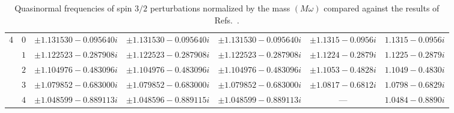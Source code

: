\begin{table}[ht]
{\begin{tabular}{l |c|c|c|c|c|c}
      4   & $0$ & $\pm 1.131530 -0.095640 i$                & $\pm 1.131530 -0.095640 i$                 & $\pm 1.131530 -0.095640 i$ & $\pm 1.1315 -0.0956 i$ & $1.1315 -0.0956 i$       \\
          & $1$ & $\pm 1.122523 -0.287908 i$                & $\pm 1.122523 -0.287908 i$                 & $\pm 1.122523 -0.287908 i$ & $\pm 1.1224 -0.2879 i$ & $1.1225 -0.2879 i$       \\
          & $2$ & $\pm 1.104976 -0.483096 i$                & $\pm 1.104976 -0.483096 i$                 & $\pm 1.104976 -0.483096 i$ & $\pm 1.1053 -0.4828 i$ & $1.1049 -0.4830 i$       \\
          & $3$ & $\pm 1.079852 -0.683000 i$                & $\pm 1.079852 -0.683000 i$                 & $\pm 1.079852 -0.683000 i$ & $\pm 1.0817 -0.6812 i$ & $1.0798 -0.6829 i$       \\
          & $4$ & $\pm 1.048599 -0.889113 i$                & $\pm 1.048596 -0.889115 i$                 & $\pm 1.048599 -0.889113 i$ & ---                    & $1.0484 -0.8890 i$       \\
      \hline\hline
    \end{tabular}
  }
  \caption{
    Quasinormal frequencies of spin $3/2$ perturbations normalized by the mass $(M\omega)$ compared against the results of Refs.~\cite{Chen:2016qii, Shu:2005fw}.
  }
  \label{Tab:Spin3/2}
\end{table}

